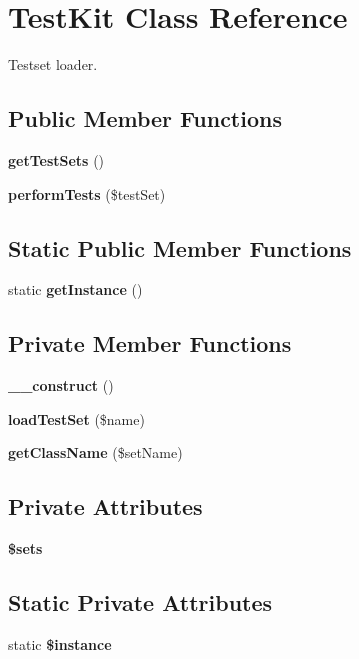 \section{TestKit Class Reference}
\label{classTestKit}


Testset loader.  


\subsection*{Public Member Functions}
\begin{DoxyCompactItemize}
\item 
{\bf getTestSets} ()
\item 
{\bf performTests} (\$testSet)
\end{DoxyCompactItemize}
\subsection*{Static Public Member Functions}
\begin{DoxyCompactItemize}
\item 
static {\bf getInstance} ()
\end{DoxyCompactItemize}
\subsection*{Private Member Functions}
\begin{DoxyCompactItemize}
\item 
{\bf \_\-\_\-construct} ()
\item 
{\bf loadTestSet} (\$name)
\item 
{\bf getClassName} (\$setName)
\end{DoxyCompactItemize}
\subsection*{Private Attributes}
\begin{DoxyCompactItemize}
\item 
{\bf \$sets}
\end{DoxyCompactItemize}
\subsection*{Static Private Attributes}
\begin{DoxyCompactItemize}
\item 
static {\bf \$instance}
\end{DoxyCompactItemize}


